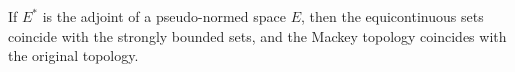 If $E^{*}$ is the adjoint of a pseudo-normed space $E$, then the equicontinuous sets coincide with the strongly bounded sets, and the Mackey topology coincides with the original topology.
